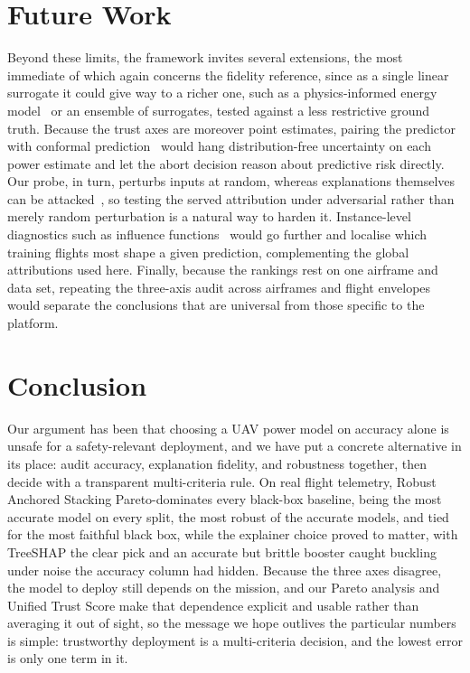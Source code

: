 \documentclass[conference]{IEEEtran}
\begin{document}
\section{Future Work}
Beyond these limits, the framework invites several extensions, the most immediate of which again concerns the fidelity reference, since as a single linear surrogate it could give way to a richer one, such as a physics-informed energy model~\cite{abeywickrama2018comprehensive} or an ensemble of surrogates, tested against a less restrictive ground truth. Because the trust axes are moreover point estimates, pairing the predictor with conformal prediction~\cite{vovk2005algorithmic} would hang distribution-free uncertainty on each power estimate and let the abort decision reason about predictive risk directly. Our probe, in turn, perturbs inputs at random, whereas explanations themselves can be attacked~\cite{slack2020fooling}, so testing the served attribution under adversarial rather than merely random perturbation is a natural way to harden it. Instance-level diagnostics such as influence functions~\cite{koh2017understanding} would go further and localise which training flights most shape a given prediction, complementing the global attributions used here. Finally, because the rankings rest on one airframe and data set, repeating the three-axis audit across airframes and flight envelopes would separate the conclusions that are universal from those specific to the platform.

\section{Conclusion}
Our argument has been that choosing a UAV power model on accuracy alone is unsafe for a safety-relevant deployment, and we have put a concrete alternative in its place: audit accuracy, explanation fidelity, and robustness together, then decide with a transparent multi-criteria rule. On real flight telemetry, Robust Anchored Stacking Pareto-dominates every black-box baseline, being the most accurate model on every split, the most robust of the accurate models, and tied for the most faithful black box, while the explainer choice proved to matter, with TreeSHAP the clear pick and an accurate but brittle booster caught buckling under noise the accuracy column had hidden. Because the three axes disagree, the model to deploy still depends on the mission, and our Pareto analysis and Unified Trust Score make that dependence explicit and usable rather than averaging it out of sight, so the message we hope outlives the particular numbers is simple: trustworthy deployment is a multi-criteria decision, and the lowest error is only one term in it.
\end{document}
